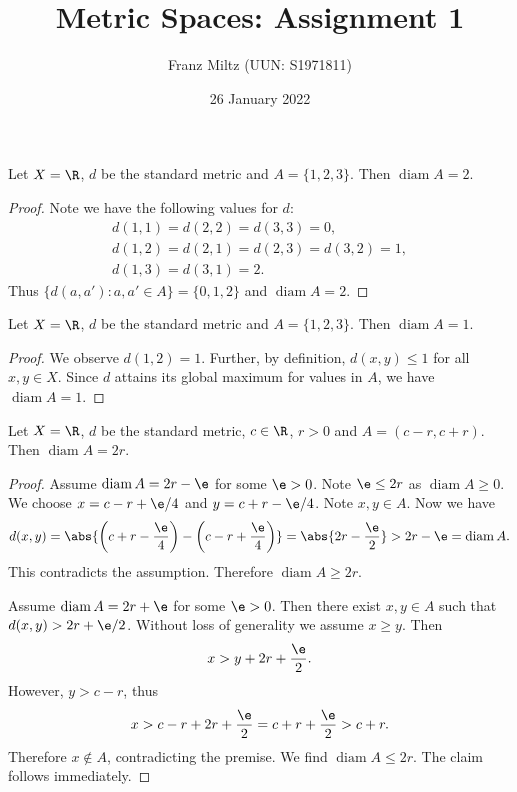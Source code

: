 \documentclass{article}
\DeclareMathOperator{\diam}{diam}
\begin{document}
\title{Metric Spaces: Assignment 1}
\author{Franz Miltz (UUN: S1971811)}
\date{26 January 2022}
\maketitle

\begin{claim*}[1a]
   Let $X=\R$, $d$ be the standard metric and $A=\{1,2,3\}$. Then $\diam A = 2$.
   \begin{proof}
      Note we have the following values for $d$:
      \begin{align*}
         d(1,1) = d(2,2) = d(3,3) = 0,\\
         d(1,2) = d(2,1) = d(2,3) = d(3,2) = 1,\\
         d(1,3) = d(3,1) = 2.
      \end{align*} 
      Thus $\{d(a,a'):a,a'\in A\}=\{0,1,2\}$ and $\diam A = 2$.
   \end{proof}
\end{claim*}

\begin{claim*}[1b]
   Let $X=\R$, $d$ be the standard metric and $A=\{1,2,3\}$. Then $\diam A=1$. 
   \begin{proof}
      We observe $d(1,2)=1$. Further, by definition, $d(x,y)\leq 1$ for all $x,y\in X$. 
      Since $d$ attains its global maximum for values in $A$, we have $\diam A=1$.
   \end{proof}
\end{claim*}

\begin{claim*}[2]
   Let $X=\R$, $d$ be the standard metric, $c\in\R$, $r>0$ and $A=(c-r,c+r)$. Then 
   $\diam A = 2r$.
   \begin{proof}
      Assume $\diam A = 2r-\e$ for some $\e>0$. Note $\e\leq 2r$ as $\diam A \geq 0$. 
      We choose $x=c-r+\e/4$ and $y=c+r-\e/4$. Note $x,y\in A$. Now we have 
      \begin{align*}
         d(x,y) = \abs{\left(c+r-\frac{\e}{4}\right)-\left(c-r+\frac{\e}{4}\right)}
         = \abs{2r-\frac{\e}{2}} > 2r - \e = \diam A.
      \end{align*}
      This contradicts the assumption. Therefore $\diam A \geq 2r$.

      Assume $\diam A = 2r+\e$ for some $\e>0$. Then there exist $x,y\in A$ such that 
      $d(x,y) > 2r+\e/2$. Without loss of generality we assume $x\geq y$. Then 
      \begin{align*}
          x > y + 2r + \frac{\e}{2}.
      \end{align*}
      However, $y > c - r$, thus 
      \begin{align*}
         x > c - r + 2r + \frac{\e}{2} = c + r + \frac{\e}{2} > c + r.
      \end{align*}
      Therefore $x\not\in A$, contradicting the premise. We find $\diam A \leq 2r$. 
      The claim follows immediately.
   \end{proof}
\end{claim*}
\end{document}
